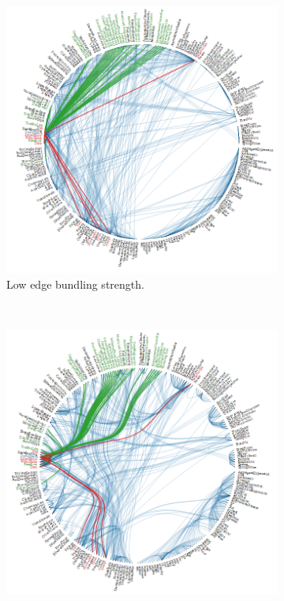 \begin{figure}
	\centering
	\begin{subfigure}[b]{0.3\textwidth}
					\centering
					\includegraphics[width=\textwidth]{img/hierarchical_edge-bundling1}
					\caption{Low edge bundling strength.}
					\label{figure:hierarchical_edge-bundling1}
	\end{subfigure}%
	~
	\begin{subfigure}[b]{0.3\textwidth}
					\centering
					\includegraphics[width=\textwidth]{img/hierarchical_edge-bundling2}

\end{subfigure}
\end{figure}
